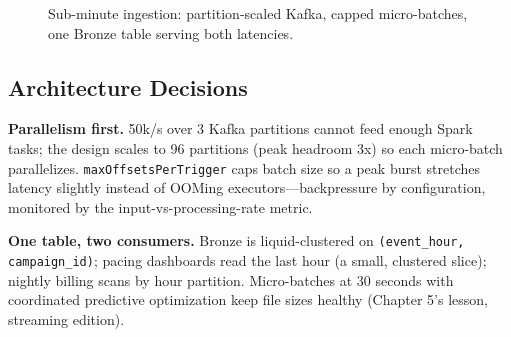 \begin{figure}[H]
    \centering
    \caption{Sub-minute ingestion: partition-scaled Kafka, capped micro-batches, one Bronze table serving both latencies.}
    \label{fig:ch13-adtech}
\end{figure}

\subsection{Architecture Decisions}
\textbf{Parallelism first.} 50k/s over 3 Kafka partitions cannot feed enough Spark tasks; the design scales to 96 partitions (peak headroom 3x) so each micro-batch parallelizes. \texttt{maxOffsetsPerTrigger} caps batch size so a peak burst stretches latency slightly instead of OOMing executors---backpressure by configuration, monitored by the input-vs-processing-rate metric.

\textbf{One table, two consumers.} Bronze is liquid-clustered on \texttt{(event\_hour, campaign\_id)}; pacing dashboards read the last hour (a small, clustered slice); nightly billing scans by hour partition. Micro-batches at 30 seconds with coordinated predictive optimization keep file sizes healthy (Chapter 5's lesson, streaming edition).

